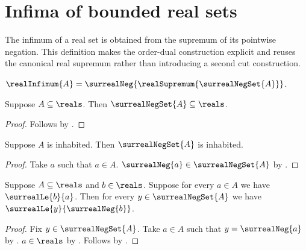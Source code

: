 \section{Infima of bounded real sets}



The infimum of a real set is obtained from the supremum of its pointwise
negation.  This definition makes the order-dual construction explicit and
reuses the canonical real supremum rather than introducing a second cut
construction.

\begin{definition}\label{real_infimum}
    $\realInfimum{A}
        =\surrealNeg{\realSupremum{\surrealNegSet{A}}}$.
\end{definition}

\begin{proposition}\label{real_negation_set_subset_reals}
    Suppose $A\subseteq\reals$.
    Then $\surrealNegSet{A}\subseteq\reals$.
\end{proposition}
\begin{proof}
    Follows by
        .
\end{proof}

\begin{proposition}\label{real_negation_set_inhabited}
    Suppose $A$ is inhabited.
    Then $\surrealNegSet{A}$ is inhabited.
\end{proposition}
\begin{proof}
    Take $a$ such that $a\in A$.
    $\surrealNeg{a}\in\surrealNegSet{A}$ by
        .
\end{proof}

\begin{proposition}\label{real_negation_set_upper_bound}
    Suppose $A\subseteq\reals$ and $b\in\reals$.
    Suppose for every $a\in A$ we have $\surrealLe{b}{a}$.
    Then for every $y\in\surrealNegSet{A}$ we have
        $\surrealLe{y}{\surrealNeg{b}}$.
\end{proposition}
\begin{proof}
    Fix $y\in\surrealNegSet{A}$.
    Take $a\in A$ such that $y=\surrealNeg{a}$ by
        .
    $a\in\reals$ by .
    Follows by
        .
\end{proof}

